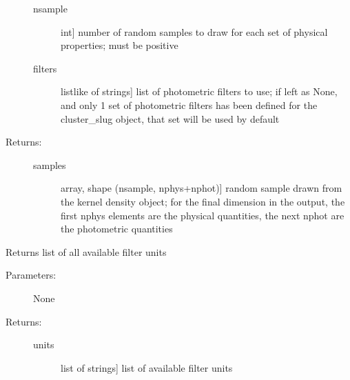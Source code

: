 \documentclass[letterpaper,10pt,english]{sphinxmanual}
\begin{document}
\begin{fulllineitems}
\begin{fulllineitems}
\begin{description}
\begin{description}
\item[{nsample}] \leavevmode{[}int{]}
number of random samples to draw for each set of
physical properties; must be positive

\item[{filters}] \leavevmode{[}listlike of strings{]}
list of photometric filters to use; if left as None, and
only 1 set of photometric filters has been defined for
the cluster\_slug object, that set will be used by
default

\end{description}

\item[{Returns:}] \leavevmode\begin{description}
\item[{samples}] \leavevmode{[}array, shape (nsample, nphys+nphot){]}
random sample drawn from the kernel density object; for
the final dimension in the output, the first nphys
elements are the physical quantities, the next nphot are
the photometric quantities

\end{description}

\end{description}

\end{fulllineitems}


\begin{fulllineitems}
\label{\detokenize{cluster_slug:slugpy.cluster_slug.cluster_slug.filter_units}}
Returns list of all available filter units
\begin{description}
\item[{Parameters:}] \leavevmode
None

\item[{Returns:}] \leavevmode\begin{description}
\item[{units}] \leavevmode{[}list of strings{]}
list of available filter units

\end{description}

\end{description}

\end{fulllineitems}



\end{fulllineitems}
\end{document}
